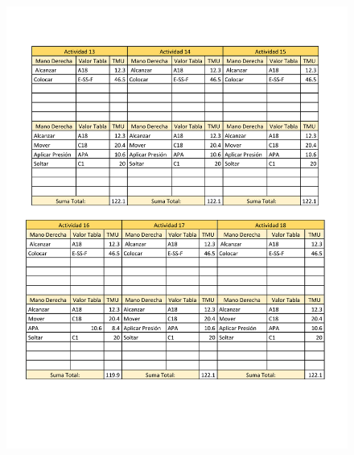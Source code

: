             \begin{figure}[H]
        \centering
        \includegraphics[trim = {5mm 37mm 1mm 10mm},clip,scale=0.35]{19/Img/tablaTMU3.pdf}
        \newpage
        \label{fig:tablaTMU3}    
    \end{figure}
